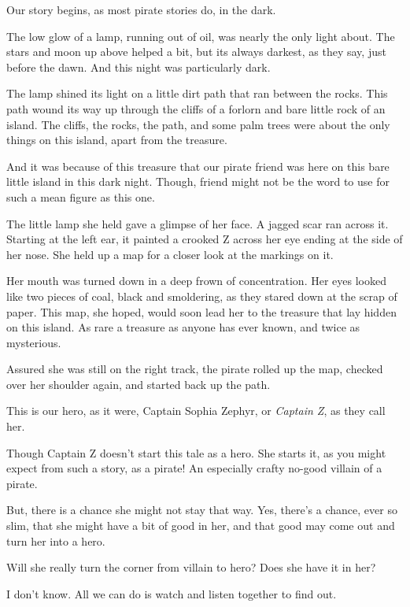 \documentclass[12pt]{extbook}
\begin{document}
  Our story begins, as most pirate stories do, in the dark.
  
  The low glow of a lamp, running out of oil, was nearly the only light
  about. The stars and moon up above helped a bit, but its always darkest,
  as they say, just before the dawn. And this night was particularly dark.
  
  The lamp shined its light on a little dirt path that ran between the
  rocks. This path wound its way up through the cliffs of a forlorn and
  bare little rock of an island. The cliffs, the rocks, the path, and some
  palm trees were about the only things on this island, apart from the
  treasure.
  
  And it was because of this treasure that our pirate friend was here on
  this bare little island in this dark night. Though, friend might not be
  the word to use for such a mean figure as this one.
  
  The little lamp she held gave a glimpse of her face. A jagged scar ran
  across it. Starting at the left ear, it painted a crooked Z across her
  eye ending at the side of her nose. She held up a map for a closer look
  at the markings on it.
  
  Her mouth was turned down in a deep frown of concentration. Her eyes
  looked like two pieces of coal, black and smoldering, as they stared
  down at the scrap of paper. This map, she hoped, would soon lead her to
  the treasure that lay hidden on this island. As rare a treasure as
  anyone has ever known, and twice as mysterious.
  
  Assured she was still on the right track, the pirate rolled up the map,
  checked over her shoulder again, and started back up the path.
  
  This is our hero, as it were, Captain Sophia Zephyr, or \emph{Captain
  Z}, as they call her.
  
  Though Captain Z doesn't start this tale as a hero. She starts it, as
  you might expect from such a story, as a pirate! An especially crafty
  no-good villain of a pirate.
  
  But, there is a chance she might not stay that way. Yes, there's a
  chance, ever so slim, that she might have a bit of good in her, and that
  good may come out and turn her into a hero.
  
  Will she really turn the corner from villain to hero? Does she have it
  in her?
  
  I don't know. All we can do is watch and listen together to find out.
  
\end{document}
